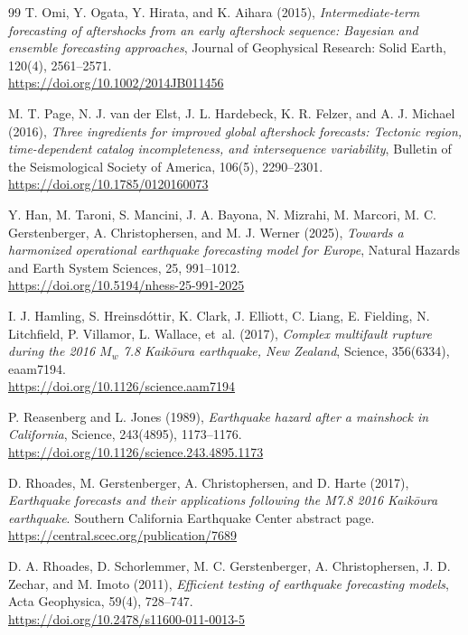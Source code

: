 \documentclass[12pt,letterpaper]{article}
\begin{document}
\begin{thebibliography}{99}
T. Omi, Y. Ogata, Y. Hirata, and K. Aihara (2015),
\emph{Intermediate-term forecasting of aftershocks from an early aftershock
sequence: Bayesian and ensemble forecasting approaches},
Journal of Geophysical Research: Solid Earth, 120(4), 2561--2571.\\
\url{https://doi.org/10.1002/2014JB011456}

M. T. Page, N. J. van der Elst, J. L. Hardebeck, K. R. Felzer, and
A. J. Michael (2016),
\emph{Three ingredients for improved global aftershock forecasts:
Tectonic region, time-dependent catalog incompleteness, and
intersequence variability},
Bulletin of the Seismological Society of America, 106(5), 2290--2301.\\
\url{https://doi.org/10.1785/0120160073}

Y. Han, M. Taroni, S. Mancini, J. A. Bayona, N. Mizrahi, M. Marcori,
M. C. Gerstenberger, A. Christophersen, and M. J. Werner (2025),
\emph{Towards a harmonized operational earthquake forecasting model for Europe},
Natural Hazards and Earth System Sciences, 25, 991--1012.\\
\url{https://doi.org/10.5194/nhess-25-991-2025}

I. J. Hamling, S. Hreinsd\'ottir, K. Clark, J. Elliott, C. Liang, E. Fielding,
N. Litchfield, P. Villamor, L. Wallace, et~al. (2017),
\emph{Complex multifault rupture during the 2016 $M_w$ 7.8 Kaik\={o}ura
earthquake, New Zealand},
Science, 356(6334), eaam7194.\\
\url{https://doi.org/10.1126/science.aam7194}

P. Reasenberg and L. Jones (1989),
\emph{Earthquake hazard after a mainshock in California},
Science, 243(4895), 1173--1176.\\
\url{https://doi.org/10.1126/science.243.4895.1173}

D. Rhoades, M. Gerstenberger, A. Christophersen, and D. Harte (2017),
\emph{Earthquake forecasts and their applications following the M7.8 2016
Kaik\={o}ura earthquake}. Southern California Earthquake Center abstract page.\\
\url{https://central.scec.org/publication/7689}

D. A. Rhoades, D. Schorlemmer, M. C. Gerstenberger, A. Christophersen,
J. D. Zechar, and M. Imoto (2011),
\emph{Efficient testing of earthquake forecasting models},
Acta Geophysica, 59(4), 728--747.\\
\url{https://doi.org/10.2478/s11600-011-0013-5}


\end{thebibliography}
\end{document}
